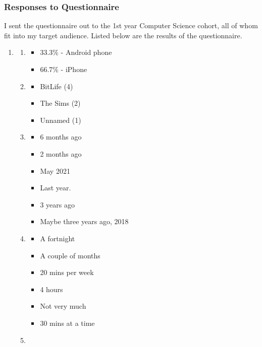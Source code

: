 \subsubsection{Responses to Questionnaire}
I sent the questionnaire out to the 1st year Computer Science cohort, all of whom fit into my target audience. Listed below are the results of the questionnaire.
\begin{enumerate}
    \item 
    \begin{enumerate}
        \item 
        \begin{itemize}
            \item 33.3\% - Android phone
            \item 66.7\% - iPhone
        \end{itemize}
        \item
        \begin{itemize}
            \item BitLife (4)
            \item The Sims (2)
            \item Unnamed (1)
        \end{itemize}
        \item
        \begin{itemize}
            \item 6 months ago
            \item 2 months ago
            \item May 2021
            \item Last year.
            \item 3 years ago
            \item Maybe three years ago, 2018
        \end{itemize}
        \item 
        \begin{itemize}
            \item A fortnight
            \item A couple of months
            \item 20 mins per week
            \item 4 hours
            \item Not very much
            \item 30 mins at a time
        \end{itemize}
        \item 
        \begin{itemize}

\end{itemize}
\end{enumerate}
\end{enumerate}
